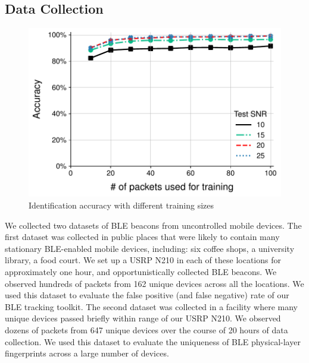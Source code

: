 \subsection*{Data Collection}

\begin{figure}
    \centering
    \includegraphics[width=\linewidth]{bletracking/plots/accuracy_esp_train2.pdf}
    \caption{Identification accuracy with different training sizes}
    \label{fig:esp_train}
\end{figure}

We collected two datasets of BLE beacons from uncontrolled mobile devices.
%
The first dataset was collected in public places that were likely to contain
many stationary BLE-enabled mobile devices, including: six coffee shops, a
university library, a food court. 
%
We set up a USRP N210 in each of these locations for approximately one hour,
and opportunistically collected BLE beacons. We observed hundreds of packets
from 162 unique devices across all the locations.
%
We used this dataset to evaluate the false positive (and false negative) rate of our BLE tracking toolkit.
%
The second dataset was collected in a facility where many unique devices passed 
briefly within range of our USRP N210. We observed dozens of packets from 647
unique devices over the course of 20 hours of data collection.
%
We used this dataset to evaluate the uniqueness of BLE physical-layer
fingerprints across a large number of devices.

%

